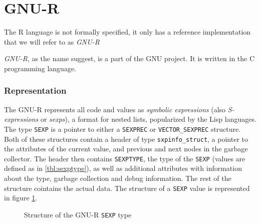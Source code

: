 \section{GNU-R}

The R language is not formally specified, it only has a reference implementation that we will refer to as \textit{GNU-R}

\textit{GNU-R}, as the name suggest, is a part of the GNU project. It is written in the C programming language. 


\subsubsection*{Representation}

The GNU-R represents all code and values as \textit{symbolic expressions} (also \textit{S-expressions} or \textit{sexps}), a format for nested lists, popularized by the Lisp languages. The type \texttt{SEXP} is a pointer to either a \texttt{SEXPREC} or \texttt{VECTOR\_SEXPREC} structure. Both of these structures contain a header of type \texttt{sxpinfo\_struct}, a pointer to the attributes of the current value, and previous and next nodes in the garbage collector. The header then contains \texttt{SEXPTYPE}, the type of the \texttt{SEXP} (values are defined as in \ref{tbl:sexptype}), as well as additional attributes with information about the type, garbage collection and debug information. The rest of the structure cointains the actual data. The structure of a \texttt{SEXP} value is represented in figure \ref{fig:sexp-struct}.

\begin{figure}
	\centering
	\begin{adjustbox}{trim=5pt 20pt 0 40pt, clip}
	\end{adjustbox}
	\caption{Structure of the GNU-R \texttt{SEXP} type}\label{fig:sexp-struct}
\end{figure}

